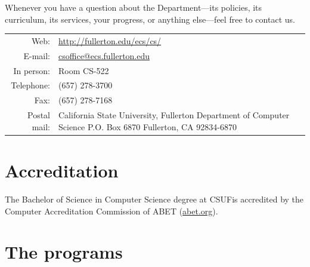 \documentclass{book}
\newcommand{\campusname}{CSUF}
\begin{document}
Whenever you have a question about the Department---its policies, its curriculum, its services, your progress, or anything else---feel free to contact us.

\begin{tabular}{rp{6in}} %
  Web: & \href{http://fullerton.edu/ecs/cs/}{http://fullerton.edu/ecs/cs/} \\ \index{website}
  E-mail: & \href{mailto:csoffice@ecs.fullerton.edu}{csoffice@ecs.fullerton.edu} \\ \index{e-mail}
  In person: & Room CS-522 \\ \index{department office}
  Telephone: & (657) 278-3700 \\ \index{phone number} \index{telephone number}
  Fax: & (657) 278-7168 \\ \index{fax number}
  Postal mail: & California State University, Fullerton \newline \index{postal address} \index{address}
Department of Computer Science \newline
P.O. Box 6870 \newline
Fullerton, CA 92834-6870
\end{tabular}

\section{Accreditation} 

The Bachelor of Science in Computer Science degree at \campusname is accredited by the Computer Accreditation Commission of ABET (\href{http://www.abet.org}{abet.org}).

\begin{center}
\end{center}

\section{The programs}
\end{document}
